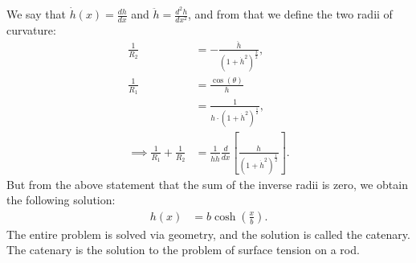 \documentclass[a4paper]{article}
\begin{document}
We say that $\dot{h}(x)=\frac{dh}{dx}$ and $\ddot{h} = \frac{d^2h}{dx^2}$, and from that we define the two radii of curvature:
\begin{align*}
    \frac{1}{R_2} &= -\frac{\ddot{h}}{(1 + \dot{h}^2)^\frac{3}{2}},\\
    \frac{1}{R_1} &= \frac{\cos(\theta)}{h}\\
    &=\frac{1}{h\cdot\left(1+\dot{h}^2\right)^\frac{1}{2}},\\
    \implies \frac{1}{R_1} + \frac{1}{R_2} &=\frac{1}{h\dot{h}}\frac{d}{dx}\left[\frac{h}{\left(1 + \dot{h}^2\right)^\frac{1}{2}}\right].
\end{align*}But from the above statement that the sum of the inverse radii is zero, we obtain the following solution:
\begin{align*}
    h(x) &=b\cosh\left(\frac{x}{b}\right).
\end{align*}The entire problem is solved via geometry, and the solution is called the catenary. The catenary is the solution to the problem of surface tension on a rod.
\end{document}
